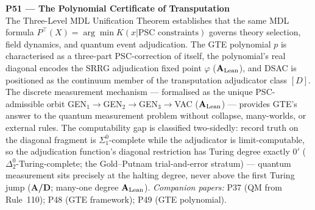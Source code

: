 \documentclass[11pt]{article}
\newcommand{\CatAL}{\ensuremath{\textbf{A}_{\rm Lean}}}
\newcommand{\CatAD}{\textbf{A/D}}
\begin{document}
\medskip
\noindent\textbf{P51 --- The Polynomial Certificate of Transputation}~\cite{SpivackPolynomialTransputation}\\
The Three-Level MDL Unification Theorem establishes that the same MDL formula
$P^\top(X)=\arg\min K(x|\text{PSC constraints})$ governs theory selection, field dynamics, and
quantum event adjudication. The GTE polynomial $p$ is characterised as a three-part PSC-correction
of itself, the polynomial's real diagonal encodes the SRRG adjudication fixed point $\varphi$
(\CatAL), and DSAC is positioned as the continuum member of the transputation adjudicator class $[D]$.
The discrete measurement mechanism --- formalised as the unique PSC-admissible orbit
GEN$_1\to$GEN$_2\to$GEN$_3\to$VAC (\CatAL) --- provides GTE's answer to the quantum measurement
problem without collapse, many-worlds, or external rules.
The computability gap is classified two-sidedly: record truth on the diagonal
fragment is $\Sigma_1^0$-complete while the adjudicator is limit-computable, so
the adjudication function's diagonal restriction has Turing degree exactly $0'$
($\Delta_2^0$-Turing-complete; the Gold--Putnam trial-and-error stratum) ---
quantum measurement sits precisely at the halting degree, never above the first
Turing jump (\CatAD; many-one degree \CatAL).
\emph{Companion papers:} P37 (QM from Rule~110); P48 (GTE framework); P49 (GTE polynomial).
\end{document}
